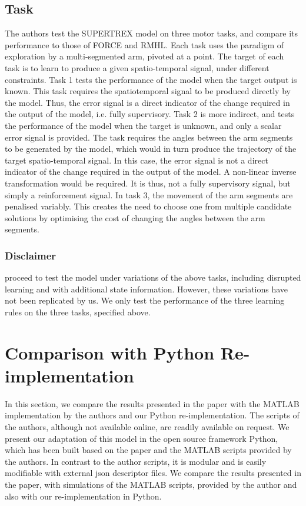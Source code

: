 \subsection{Task}

The authors test the SUPERTREX model on three motor tasks, and compare its performance to those of FORCE and RMHL. Each task uses the paradigm of exploration by a multi-segmented arm, pivoted at a point. The target of each task is to learn to produce a given spatio-temporal signal, under different constraints. Task 1 tests the performance of the model when the target output is known. This task requires the spatiotemporal signal to be produced directly by the model. Thus, the error signal is a direct indicator of the change required in the output of the model, i.e. fully supervisory. Task 2 is more indirect, and tests the performance of the model when the target is unknown, and only a scalar error signal is provided. The task requires the angles between the arm segments to be generated by the model, which would in turn produce the trajectory of the target spatio-temporal signal. In this case, the error signal is not a direct indicator of the change required in the output of the model. A non-linear inverse transformation would be required. It is thus, not a fully supervisory signal, but simply a reinforcement signal. In task 3, the movement of the arm segments are penalised variably. This creates the need to choose one from multiple candidate solutions by optimising the cost of changing the angles between the arm segments.


\subsubsection{Disclaimer}
\textcite{pyle2019} proceed to test the model under variations of the above tasks, including disrupted learning and with additional state information. However, these variations have not been replicated by us. We only test the performance of the three learning rules on the three tasks, specified above.


\section{Comparison with Python Re-implementation}

In this section, we compare the results presented in the paper \cite{pyle2019} with the MATLAB implementation by the authors and our Python re-implementation. The scripts of the authors, although not available online, are readily available on request. We present our adaptation of this model in the open source framework Python, which has been built based on the paper and the MATLAB scripts provided by the authors. In contrast to the author scripts, it is modular and is easily modifiable with external json descriptor files. We compare the results presented in the paper, with simulations of the MATLAB scripts, provided by the author and also with our re-implementation in Python.\\ 

